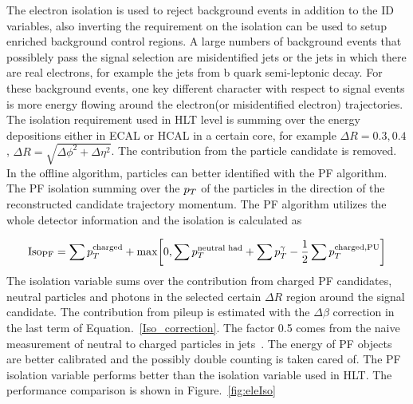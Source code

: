 The electron isolation is used to reject background events in addition to the ID variables, also inverting the requirement on the isolation can be used to setup enriched background control regions. A large numbers of background events that possiblely pass the signal selection are misidentified jets or the jets in which there are real electrons, for example the jets from b quark semi-leptonic decay. For these background events, one key different character with respect to signal events is more energy flowing around the electron(or misidentified electron) trajectories. The isolation requirement used in HLT level is summing over the energy depositions either in ECAL or HCAL in a certain core, for example $\Delta R=0.3,0.4$, $\Delta R=\sqrt{\Delta \phi^{2}+\Delta\eta^{2}}$. The contribution from the particle candidate is removed. In the offline algorithm, particles can better identified with the PF algorithm. The PF isolation summing over the $p_{T}$ of the particles in the direction of the reconstructed candidate trajectory momentum. The PF algorithm utilizes the whole detector information and the isolation is calculated as



\begin{equation}\label{Iso_correction}
\textrm{Iso}_{\textrm{PF}}=\sum p_{T}^{\textrm{charged}}+\textrm{max}\bigg[ 0,\sum p_{T}^{\textrm{neutral~had}} +\sum p_{T}^{\gamma}-\frac{1}{2}\sum p_{T}^{\textrm{charged,PU}}\bigg]
\end{equation}
The isolation variable sums over the contribution from charged PF candidates, neutral particles and photons in the selected certain $\Delta R$ region around the signal candidate. The contribution from pileup is estimated with the $\Delta \beta$ correction in the last term of Equation.~\ref{Iso_correction}. The factor 0.5 comes from the naive measurement of neutral to charged particles in jets~\cite{FastJetalso}. The energy of PF objects are better calibrated and the possibly double counting is taken cared of. The PF isolation variable performs better than the isolation variable used in HLT. The performance comparison is shown in Figure.~\ref{fig:eleIso}

